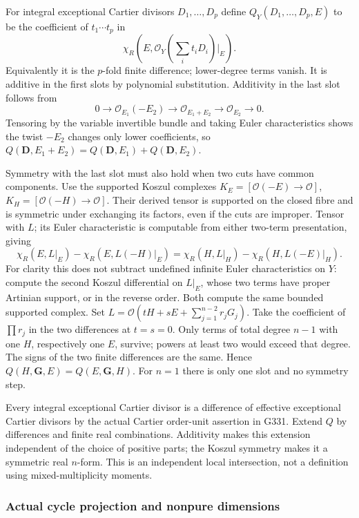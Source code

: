 \documentclass[
]{article}
\begin{document}
For integral exceptional Cartier divisors \(D_1,\ldots,D_p\) define
\(Q_Y(D_1,\ldots,D_p,E)\) to be the coefficient of \(t_1\cdots t_p\) in
\[\chi_R(E,\mathcal O_Y(\sum_i t_iD_i)|_E).\] Equivalently it is the
\(p\)-fold finite difference; lower-degree terms vanish. It is additive
in the first slots by polynomial substitution. Additivity in the last
slot follows from
\[0\longrightarrow\mathcal O_{E_1}(-E_2)\longrightarrow\mathcal O_{E_1+E_2}
\longrightarrow\mathcal O_{E_2}\longrightarrow0.\] Tensoring by the
variable invertible bundle and taking Euler characteristics shows the
twist \(-E_2\) changes only lower coefficients, so
\(Q(\boldsymbol D,E_1+E_2)=Q(\boldsymbol D,E_1)+Q(\boldsymbol D,E_2)\).

Symmetry with the last slot must also hold when two cuts have common
components. Use the supported Koszul complexes
\(K_E=[\mathcal O(-E)\to\mathcal O]\),
\(K_H=[\mathcal O(-H)\to\mathcal O]\). Their derived tensor is supported
on the closed fibre and is symmetric under exchanging its factors, even
if the cuts are improper. Tensor with \(L\); its Euler characteristic is
computable from either two-term presentation, giving
\[\chi_R(E,L|_E)-\chi_R(E,L(-H)|_E)
=\chi_R(H,L|_H)-\chi_R(H,L(-E)|_H).\] For clarity this does not subtract
undefined infinite Euler characteristics on \(Y\): compute the second
Koszul differential on \(L|_E\), whose two terms have proper Artinian
support, or in the reverse order. Both compute the same bounded
supported complex. Set \(L=\mathcal O(tH+sE+\sum_{j=1}^{n-2}r_jG_j)\).
Take the coefficient of \(\prod r_j\) in the two differences at
\(t=s=0\). Only terms of total degree \(n-1\) with one \(H\),
respectively one \(E\), survive; powers at least two would exceed that
degree. The signs of the two finite differences are the same. Hence
\(Q(H,\boldsymbol G,E)=Q(E,\boldsymbol G,H)\). For \(n=1\) there is only
one slot and no symmetry step.

Every integral exceptional Cartier divisor is a difference of effective
exceptional Cartier divisors by the actual Cartier order-unit assertion
in G331. Extend \(Q\) by differences and finite real combinations.
Additivity makes this extension independent of the choice of positive
parts; the Koszul symmetry makes it a symmetric real \(n\)-form. This is
an independent local intersection, not a definition using
mixed-multiplicity moments.

\subsubsection{Actual cycle projection and nonpure
dimensions}\label{actual-cycle-projection-and-nonpure-dimensions}
\end{document}
